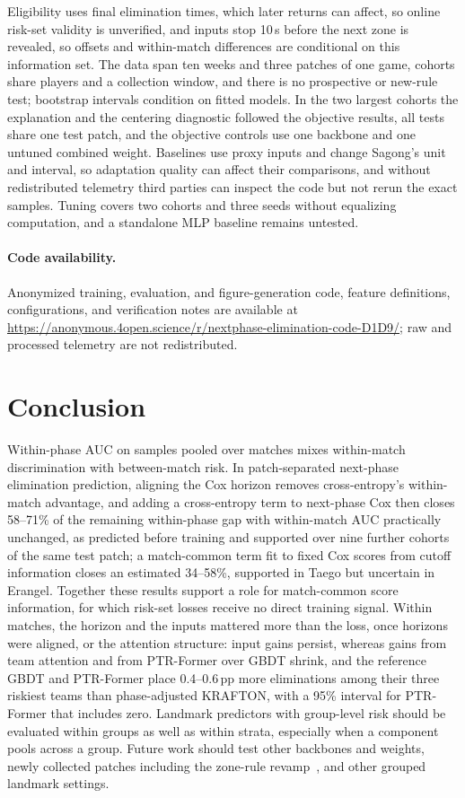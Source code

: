 \documentclass[sigconf,anonymous]{acmart}
\newcommand{\artifacturl}{\url{https://anonymous.4open.science/r/nextphase-elimination-code-D1D9/}}
\begin{document}
Eligibility uses final elimination times, which later returns can affect, so online risk-set validity is unverified, and inputs stop 10\,s before the next zone is revealed, so offsets and within-match differences are conditional on this information set. The data span ten weeks and three patches of one game, cohorts share players and a collection window, and there is no prospective or new-rule test; bootstrap intervals condition on fitted models. In the two largest cohorts the explanation and the centering diagnostic followed the objective results, all tests share one test patch, and the objective controls use one backbone and one untuned combined weight. Baselines use proxy inputs and change Sagong's unit and interval, so adaptation quality can affect their comparisons, and without redistributed telemetry third parties can inspect the code but not rerun the exact samples. Tuning covers two cohorts and three seeds without equalizing computation, and a standalone MLP baseline remains untested.

\paragraph{Code availability.}
Anonymized training, evaluation, and figure-generation code, feature definitions, configurations, and verification notes are available at \artifacturl{}; raw and processed telemetry are not redistributed.

\section{Conclusion}
\label{sec:conclusion}
Within-phase AUC on samples pooled over matches mixes within-match discrimination with between-match risk. In patch-separated next-phase elimination prediction, aligning the Cox horizon removes cross-entropy's within-match advantage, and adding a cross-entropy term to next-phase Cox then closes 58--71\% of the remaining within-phase gap with within-match AUC practically unchanged, as predicted before training and supported over nine further cohorts of the same test patch; a match-common term fit to fixed Cox scores from cutoff information closes an estimated 34--58\%, supported in Taego but uncertain in Erangel. Together these results support a role for match-common score information, for which risk-set losses receive no direct training signal. Within matches, the horizon and the inputs mattered more than the loss, once horizons were aligned, or the attention structure: input gains persist, whereas gains from team attention and from PTR-Former over GBDT shrink, and the reference GBDT and PTR-Former place 0.4--0.6\,pp more eliminations among their three riskiest teams than phase-adjusted KRAFTON, with a 95\% interval for PTR-Former that includes zero. Landmark predictors with group-level risk should be evaluated within groups as well as within strata, especially when a component pools across a group. Future work should test other backbones and weights, newly collected patches including the zone-rule revamp~\cite{PUBGBlueZone2026}, and other grouped landmark settings.
\end{document}
